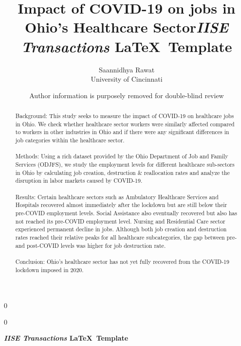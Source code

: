 \documentclass[11pt]{article}
\newcommand{\blind}{0}
\begin{document}
		
		\def\spacingset#1{\renewcommand{\baselinestretch}%
			{#1}\small\normalsize} \spacingset{1}
		
		\blind
		{
			\title{\bf Impact of COVID-19 on jobs in \\ Ohio's Healthcare Sector}
			\author{Saannidhya Rawat \\
			University of Cincinnati\\
              }
			\date{}
			\maketitle
		} \fi
		
		\blind
		{

            \title{\bf \emph{IISE Transactions} \LaTeX \ Template}
			\author{Author information is purposely removed for double-blind review}
			
\bigskip
			\bigskip
			\bigskip
			\begin{center}
				{\LARGE\bf \emph{IISE Transactions} \LaTeX \ Template}
			\end{center}
			\medskip
		} \fi
		\bigskip
		
	\begin{abstract}
	\noindent%
Background: This study seeks to measure the impact of COVID-19 on healthcare jobs in Ohio. We check whether healthcare sector workers were similarly affected compared to workers in other industries in Ohio and if there were any significant differences in job categories within the healthcare sector.
\\
\\
Methods: Using a rich dataset provided by the Ohio Department of Job and Family Services (ODJFS), we study the employment levels for different healthcare sub-sectors in Ohio by calculating job creation, destruction \& reallocation rates and analyze the disruption in labor markets caused by COVID-19.
\\
\\
Results: Certain healthcare sectors such as Ambulatory Healthcare Services and Hospitals recovered almost immediately after the lockdown but are still below their pre-COVID employment levels. Social Assistance also eventually recovered but also has not reached its pre-COVID employment level. Nursing and Residential Care sector experienced permanent decline in jobs. Although both job creation and destruction rates reached their relative peaks for all healthcare subcategories, the gap between pre- and post-COVID levels was higher for job destruction rate.
\\
\\
Conclusion: Ohio’s healthcare sector has not yet fully recovered from the COVID-19 lockdown imposed in 2020.
 \\


	\end{abstract}
			
\end{document}
